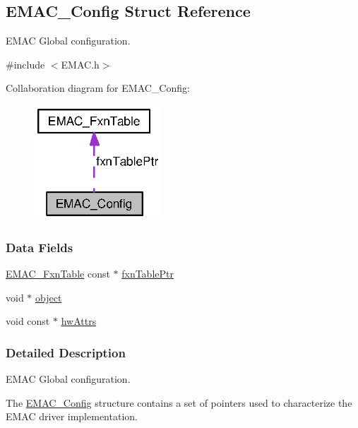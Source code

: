 \subsection{E\+M\+A\+C\+\_\+\+Config Struct Reference}
\label{struct_e_m_a_c___config}


E\+M\+A\+C Global configuration.  




{\ttfamily \#include $<$E\+M\+A\+C.\+h$>$}



Collaboration diagram for E\+M\+A\+C\+\_\+\+Config\+:
\nopagebreak
\begin{figure}[H]
\begin{center}
\leavevmode
\includegraphics[width=136pt]{struct_e_m_a_c___config__coll__graph}
\end{center}
\end{figure}
\subsubsection*{Data Fields}
\begin{DoxyCompactItemize}
\item 
\hyperlink{struct_e_m_a_c___fxn_table}{E\+M\+A\+C\+\_\+\+Fxn\+Table} const $\ast$ \hyperlink{struct_e_m_a_c___config_ab185f772142dc7bcc7276b910f3fc15a}{fxn\+Table\+Ptr}
\item 
void $\ast$ \hyperlink{struct_e_m_a_c___config_a8eb24eaa3ce2d86c33bca0762856ec0a}{object}
\item 
void const $\ast$ \hyperlink{struct_e_m_a_c___config_a540dbb956eb8a63c306cd913709e9536}{hw\+Attrs}
\end{DoxyCompactItemize}


\subsubsection{Detailed Description}
E\+M\+A\+C Global configuration. 

The \hyperlink{struct_e_m_a_c___config}{E\+M\+A\+C\+\_\+\+Config} structure contains a set of pointers used to characterize the E\+M\+A\+C driver implementation.

